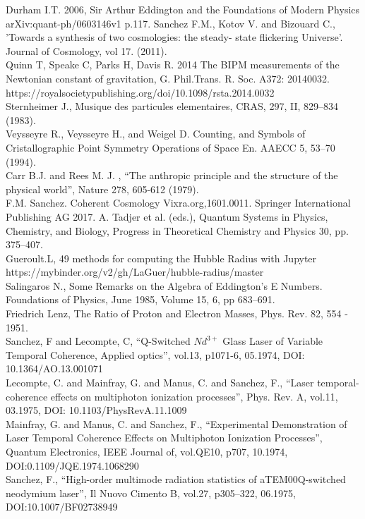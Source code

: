 \documentclass[a4paper,9pt]{article}
\begin{document}
\begin{thebibliography}{99}
 Durham I.T. 2006, Sir Arthur Eddington and the Foundations of Modern Physics arXiv:quant-ph/0603146v1  p.117.
 Sanchez F.M., Kotov V. and Bizouard C., 'Towards a synthesis of two cosmologies: the steady- state flickering Universe'. Journal of Cosmology, vol 17. (2011).\\
 Quinn T, Speake C, Parks H, Davis R. 2014 The BIPM measurements of the Newtonian constant of gravitation, G. Phil.Trans. R. Soc. A372: 20140032. https://royalsocietypublishing.org/doi/10.1098/rsta.2014.0032 \\
 Sternheimer J., Musique des particules elementaires, CRAS, 297, II, 829--834 (1983).\\
 Veysseyre R., Veysseyre H., and Weigel D. Counting, and Symbols of Cristallographic Point Symmetry Operations of Space En. AAECC 5, 53--70 (1994).\\
 Carr B.J. and Rees M. J. , “The anthropic principle and the structure of the physical world”, Nature 278, 605-612 (1979).\\
 F.M. Sanchez. Coherent Cosmology Vixra.org,1601.0011. Springer International Publishing AG 2017. A. Tadjer et al. (eds.), Quantum Systems in Physics, Chemistry, and Biology, Progress in Theoretical Chemistry and Physics 30, pp. 375--407. \\ 
 Gueroult.L, 49 methods for computing the Hubble Radius with Jupyter https://mybinder.org/v2/gh/LaGuer/hubble-radius/master \\
 Salingaros N., Some Remarks on the Algebra of Eddington's E Numbers. Foundations of Physics, June 1985, Volume 15, 6, pp 683–691.\\
 Friedrich Lenz, The Ratio of Proton and Electron Masses, Phys. Rev. 82, 554 - 1951.\\

 Sanchez, F and Lecompte, C, ``Q-Switched $Nd^{3+}$ Glass Laser of Variable Temporal Coherence, Applied optics'', vol.13, p1071-6, 05.1974, DOI: 10.1364/AO.13.001071 \\


 Lecompte, C. and Mainfray, G. and Manus, C. and Sanchez, F., ``Laser temporal-coherence effects on multiphoton ionization processes'', Phys. Rev. A, vol.11, 03.1975, DOI: 10.1103/PhysRevA.11.1009 \\

 Mainfray, G. and Manus, C. and Sanchez, F., ``Experimental Demonstration of Laser Temporal Coherence Effects on Multiphoton Ionization Processes'', Quantum Electronics, IEEE Journal of, vol.QE10, p707, 10.1974, DOI:0.1109/JQE.1974.1068290 \\


 Sanchez, F., ``High-order multimode radiation statistics of aTEM00Q-switched neodymium laser'', Il Nuovo Cimento B, vol.27, p305--322, 06.1975, DOI:10.1007/BF02738949 \\


\end{thebibliography}
\end{document}
